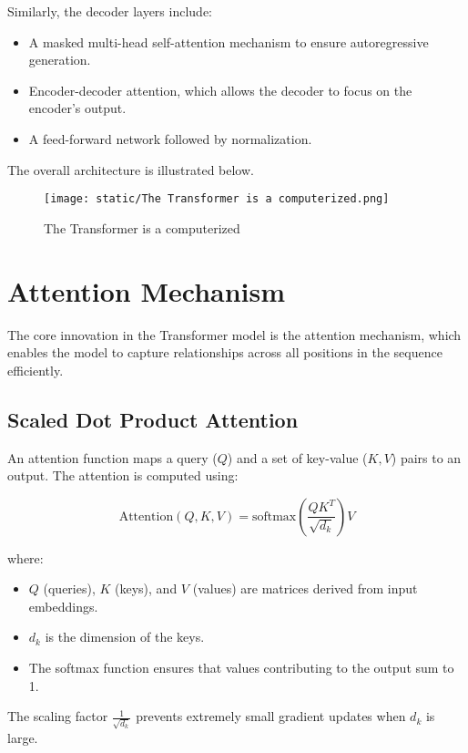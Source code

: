 \documentclass{article}
\begin{document}
Similarly, the decoder layers include:
\begin{itemize}
    \item A masked multi-head self-attention mechanism to ensure autoregressive generation.
    \item Encoder-decoder attention, which allows the decoder to focus on the encoder’s output.
    \item A feed-forward network followed by normalization.
\end{itemize}

The overall architecture is illustrated below.

\begin{figure}[h!]
    \centering
    \texttt{[image: static/The Transformer is a computerized.png]}
    \caption{The Transformer is a computerized}
\end{figure}


\section{Attention Mechanism}
\label{sec:attention}

The core innovation in the Transformer model is the attention mechanism, which enables the model to capture relationships across all positions in the sequence efficiently.

\subsection{Scaled Dot Product Attention}

An attention function maps a query ($Q$) and a set of key-value ($K, V$) pairs to an output. The attention is computed using:

\begin{equation}
    \text{Attention}(Q, K, V) = \text{softmax} \left(\frac{Q K^T}{\sqrt{d_k}}\right) V
\end{equation}

where:
\begin{itemize}
    \item $Q$ (queries), $K$ (keys), and $V$ (values) are matrices derived from input embeddings.
    \item $d_k$ is the dimension of the keys.
    \item The softmax function ensures that values contributing to the output sum to 1.
\end{itemize}

The scaling factor $\frac{1}{\sqrt{d_k}}$ prevents extremely small gradient updates when $d_k$ is large.
\end{document}
